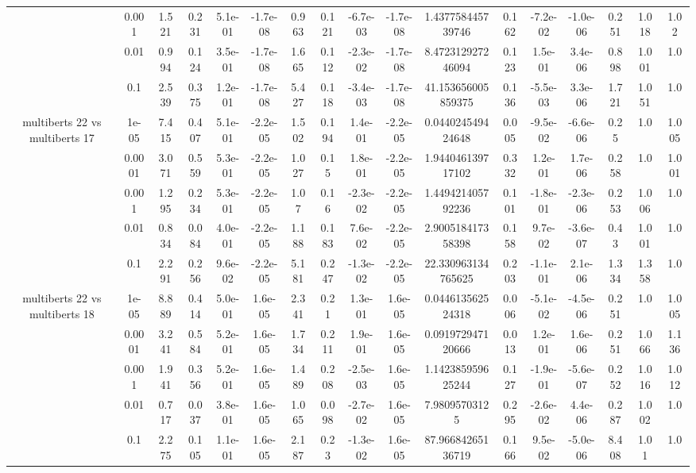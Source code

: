 \begin{tabular}{|c|c|c|c|c|c|c|c|c|c|c|c|c|c|c|c|c|}
 & 0.001 & 1.521 & 0.231 & 5.1e-01 & -1.7e-08 & 0.963 & 0.121 & -6.7e-03 & -1.7e-08 & 1.437758445739746 & 0.162 & -7.2e-02 & -1.0e-06 & 0.251 & 1.018 & 1.02 \\
 & 0.01 & 0.994 & 0.124 & 3.5e-01 & -1.7e-08 & 1.665 & 0.112 & -2.3e-02 & -1.7e-08 & 8.472312927246094 & 0.123 & 1.5e-01 & 3.4e-06 & 0.898 & 1.001 & 1.0 \\
 & 0.1 & 2.539 & 0.375 & 1.2e-01 & -1.7e-08 & 5.427 & 0.118 & -3.4e-03 & -1.7e-08 & 41.153656005859375 & 0.136 & -5.5e-03 & 3.3e-06 & 1.721 & 1.051 & 1.0 \\
\hline
\multirow{5}{*}{multiberts 22 vs multiberts 17} & 1e-05 & 7.415 & 0.407 & 5.1e-01 & -2.2e-05 & 1.502 & 0.194 & 1.4e-01 & -2.2e-05 & 0.044024549424648 & 0.005 & -9.5e-02 & -6.6e-06 & 0.25 & 1.0 & 1.005 \\
 & 0.0001 & 3.071 & 0.559 & 5.3e-01 & -2.2e-05 & 1.027 & 0.15 & 1.8e-01 & -2.2e-05 & 1.944046139717102 & 0.332 & 1.2e-01 & 1.7e-06 & 0.258 & 1.0 & 1.001 \\
 & 0.001 & 1.295 & 0.234 & 5.3e-01 & -2.2e-05 & 1.07 & 0.16 & -2.3e-02 & -2.2e-05 & 1.449421405792236 & 0.101 & -1.8e-01 & -2.3e-06 & 0.253 & 1.006 & 1.0 \\
 & 0.01 & 0.834 & 0.084 & 4.0e-01 & -2.2e-05 & 1.188 & 0.183 & 7.6e-02 & -2.2e-05 & 2.900518417358398 & 0.158 & 9.7e-02 & -3.6e-07 & 0.43 & 1.001 & 1.0 \\
 & 0.1 & 2.291 & 0.256 & 9.6e-02 & -2.2e-05 & 5.181 & 0.247 & -1.3e-02 & -2.2e-05 & 22.330963134765625 & 0.203 & -1.1e-01 & 2.1e-06 & 1.334 & 1.358 & 1.0 \\
\hline
\multirow{5}{*}{multiberts 22 vs multiberts 18} & 1e-05 & 8.889 & 0.414 & 5.0e-01 & 1.6e-05 & 2.341 & 0.21 & 1.3e-01 & 1.6e-05 & 0.044613562524318 & 0.006 & -5.1e-02 & -4.5e-06 & 0.251 & 1.0 & 1.005 \\
 & 0.0001 & 3.241 & 0.584 & 5.2e-01 & 1.6e-05 & 1.734 & 0.211 & 1.9e-01 & 1.6e-05 & 0.091972947120666 & 0.013 & 1.2e-01 & 1.6e-06 & 0.251 & 1.066 & 1.136 \\
 & 0.001 & 1.941 & 0.356 & 5.2e-01 & 1.6e-05 & 1.489 & 0.208 & -2.5e-03 & 1.6e-05 & 1.142385959625244 & 0.127 & -1.9e-01 & -5.6e-07 & 0.252 & 1.016 & 1.012 \\
 & 0.01 & 0.717 & 0.037 & 3.8e-01 & 1.6e-05 & 1.065 & 0.098 & -2.7e-02 & 1.6e-05 & 7.98095703125 & 0.295 & -2.6e-02 & 4.4e-06 & 0.287 & 1.002 & 1.0 \\
 & 0.1 & 2.275 & 0.105 & 1.1e-01 & 1.6e-05 & 2.187 & 0.23 & -1.3e-02 & 1.6e-05 & 87.96684265136719 & 0.166 & 9.5e-02 & -5.0e-06 & 8.408 & 1.01 & 1.0 \\

\end{tabular}
